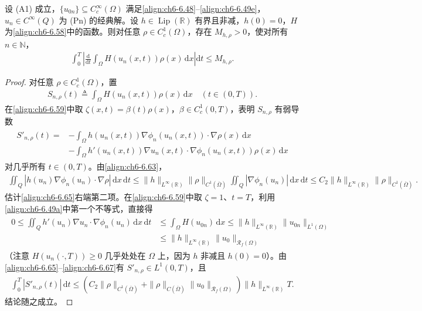 \documentclass[../../main.tex]{subfiles}%
\begin{document}
\begin{lemma}[重整化量的有界变差估计]\label{lemma:ch06-6.5.6}
设 (A1) 成立，$\{u_{0n}\}\subseteq C^\infty_c(\Omega)$ 满足\eqref{align:ch6-6.48}--\eqref{align:ch6-6.49e}，$u_n\in C^\infty(Q)$ 为 (Pn) 的经典解。设 $h\in\operatorname{Lip}(\mathbb{R})$ 有界且非减，$h(0)=0$，$H$ 为\eqref{align:ch6-6.58}中的函数。则对任意 $\rho\in C^1_c(\Omega)$，存在 $M_{h,\rho}>0$，使对所有 $n\in\mathbb{N}$，
\begin{align}
\int_0^T\left|\frac{\mathrm{d}}{\mathrm{d}t}\int_\Omega H(u_n(x,t))\rho(x)\,\mathrm{d}x\right|\mathrm{d}t\leqslant M_{h,\rho}. \label{align:ch6-6.64}
\end{align}
\end{lemma}

\begin{proof}
对任意 $\rho\in C^1_c(\Omega)$，置
\begin{align}
S_{n,\rho}(t)\triangleq\int_\Omega H(u_n(x,t))\rho(x)\,\mathrm{d}x\quad(t\in(0,T)).
\label{align:ch6-6.65}
\end{align}
在\eqref{align:ch6-6.59}中取 $\zeta(x,t)=\beta(t)\rho(x)$，$\beta\in C^1_c(0,T)$，表明 $S_{n,\rho}$ 有弱导数
\begin{align}
\begin{aligned}
S'_{n,\rho}(t)={}&-\int_\Omega h(u_n(x,t))\nabla\phi_n(u_n(x,t))\cdot\nabla\rho(x)\,\mathrm{d}x\\
&-\int_\Omega h'(u_n(x,t))\nabla u_n(x,t)\cdot\nabla\phi_n(u_n(x,t))\rho(x)\,\mathrm{d}x
\end{aligned}
\end{align}
对几乎所有 $t\in(0,T)$。由\eqref{align:ch6-6.63}，
\begin{align}
\iint_Q|h(u_n)\nabla\phi_n(u_n)\cdot\nabla\rho|\,\mathrm{d}x\,\mathrm{d}t
\leqslant\|h\|_{L^\infty(\mathbb{R})}\|\rho\|_{C^1(\overline\Omega)}
\iint_Q|\nabla\phi_n(u_n)|\,\mathrm{d}x\,\mathrm{d}t
\leqslant C_2\|h\|_{L^\infty(\mathbb{R})}\|\rho\|_{C^1(\overline\Omega)}. \label{align:ch6-6.66}
\end{align}
估计\eqref{align:ch6-6.65}右端第二项。在\eqref{align:ch6-6.59}中取 $\zeta=1$、$t=T$，利用\eqref{align:ch6-6.49a}中第一个不等式，直接得
\begin{align}
\begin{aligned}
0\leqslant\iint_Qh'(u_n)\nabla u_n\cdot\nabla\phi_n(u_n)\,\mathrm{d}x\,\mathrm{d}t
&\leqslant\int_\Omega H(u_{0n})\,\mathrm{d}x
\leqslant\|h\|_{L^\infty(\mathbb{R})}\|u_{0n}\|_{L^1(\Omega)}\\
&\leqslant\|h\|_{L^\infty(\mathbb{R})}\|u_0\|_{\mathscr{R}_f(\Omega)} 
\end{aligned}
\label{align:ch6-6.67}
\end{align}
（注意 $H(u_n(\cdot,T))\geqslant0$ 几乎处处在 $\Omega$ 上，因为 $h$ 非减且 $h(0)=0$）。由\eqref{align:ch6-6.65}--\eqref{align:ch6-6.67}有 $S'_{n,\rho}\in L^1(0,T)$，且
\begin{align}
\int_0^T|S'_{n,\rho}(t)|\,\mathrm{d}t
\leqslant(C_2\|\rho\|_{C^1(\overline\Omega)}+\|\rho\|_{C(\overline\Omega)}\|u_0\|_{\mathscr{R}_f(\Omega)})
\|h\|_{L^\infty(\mathbb{R})}T. \label{align:ch6-6.68}
\end{align}
结论随之成立。
\end{proof}
\end{document}
